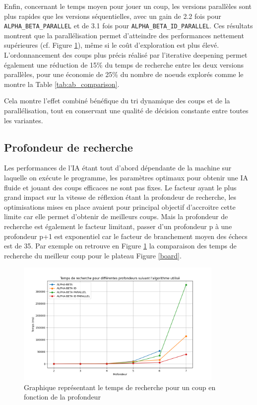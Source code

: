 \documentclass{article}
\begin{document}
Enfin, concernant le temps moyen pour jouer un coup, les versions parallèles sont plus rapides que les versions séquentielles, avec un gain de 2.2 fois pour \texttt{ALPHA\_BETA\_PARALLEL} et de 3.1 fois pour \texttt{ALPHA\_BETA\_ID\_PARALLEL}. Ces résultats montrent que la parallélisation permet d'atteindre des performances nettement supérieures (cf. Figure \ref{plot}), même si le coût d'exploration est plus élevé.
L'ordonnancement des coups plus précis réalisé par l'iterative deepening permet également une réduction de 15\% du temps de recherche entre les deux versions parallèles, pour une économie de 25\% du nombre de noeuds explorés comme le montre la Table \ref{tab:ab_comparison}.

Cela montre l'effet combiné bénéfique du tri dynamique des coups et de la parallélisation, tout en conservant une qualité de décision constante entre toutes les variantes.


\subsection{Profondeur de recherche}

Les performances de l'IA étant tout d'abord dépendante de la machine sur laquelle on exécute le programme, les paramètres optimaux pour obtenir une IA fluide et jouant des coups efficaces 
ne sont pas fixes. Le facteur ayant le plus grand impact sur la vitesse de réflexion étant la profondeur de recherche, les optimisations mises en place avaient pour principal objectif d'accroitre
cette limite car elle permet d'obtenir de meilleurs coups. Mais la profondeur de recherche est également le facteur limitant, passer d'un profondeur p à une profondeur p+1 est exponentiel car le facteur
de branchement moyen des échecs est de 35. Par exemple on retrouve en Figure \ref{plot} la comparaison des temps de recherche du meilleur coup pour le plateau Figure \ref{board}.

\begin{figure}[h]
    \centering
    \includegraphics[width=\textwidth,height=6.0cm,keepaspectratio]{plot_depth.png}
    \caption{Graphique représentant le temps de recherche pour un coup en fonction de la profondeur}
    \label{plot}
\end{figure}
\end{document}
